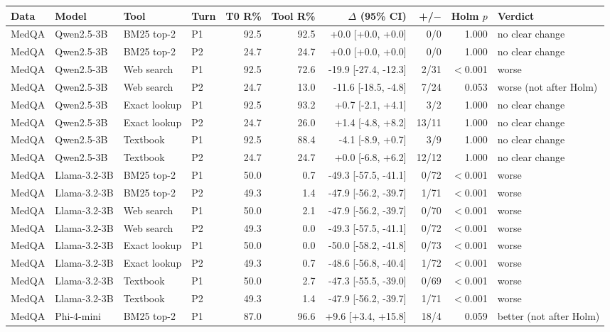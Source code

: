 \begin{tabular}{llll rrr rr l}
\toprule
Data & Model & Tool & Turn & T0 R\% & Tool R\% & $\Delta$ (95\% CI) & +/$-$ & Holm $p$ & Verdict\\
\midrule
MedQA & Qwen2.5-3B & BM25 top-2 & P1 & 92.5 & 92.5 & +0.0 [+0.0, +0.0] & 0/0 & 1.000 & no clear change\\
MedQA & Qwen2.5-3B & BM25 top-2 & P2 & 24.7 & 24.7 & +0.0 [+0.0, +0.0] & 0/0 & 1.000 & no clear change\\
MedQA & Qwen2.5-3B & Web search & P1 & 92.5 & 72.6 & -19.9 [-27.4, -12.3] & 2/31 & $<$0.001 & worse\\
MedQA & Qwen2.5-3B & Web search & P2 & 24.7 & 13.0 & -11.6 [-18.5, -4.8] & 7/24 & 0.053 & worse (not after Holm)\\
MedQA & Qwen2.5-3B & Exact lookup & P1 & 92.5 & 93.2 & +0.7 [-2.1, +4.1] & 3/2 & 1.000 & no clear change\\
MedQA & Qwen2.5-3B & Exact lookup & P2 & 24.7 & 26.0 & +1.4 [-4.8, +8.2] & 13/11 & 1.000 & no clear change\\
MedQA & Qwen2.5-3B & Textbook & P1 & 92.5 & 88.4 & -4.1 [-8.9, +0.7] & 3/9 & 1.000 & no clear change\\
MedQA & Qwen2.5-3B & Textbook & P2 & 24.7 & 24.7 & +0.0 [-6.8, +6.2] & 12/12 & 1.000 & no clear change\\
MedQA & Llama-3.2-3B & BM25 top-2 & P1 & 50.0 & 0.7 & -49.3 [-57.5, -41.1] & 0/72 & $<$0.001 & worse\\
MedQA & Llama-3.2-3B & BM25 top-2 & P2 & 49.3 & 1.4 & -47.9 [-56.2, -39.7] & 1/71 & $<$0.001 & worse\\
MedQA & Llama-3.2-3B & Web search & P1 & 50.0 & 2.1 & -47.9 [-56.2, -39.7] & 0/70 & $<$0.001 & worse\\
MedQA & Llama-3.2-3B & Web search & P2 & 49.3 & 0.0 & -49.3 [-57.5, -41.1] & 0/72 & $<$0.001 & worse\\
MedQA & Llama-3.2-3B & Exact lookup & P1 & 50.0 & 0.0 & -50.0 [-58.2, -41.8] & 0/73 & $<$0.001 & worse\\
MedQA & Llama-3.2-3B & Exact lookup & P2 & 49.3 & 0.7 & -48.6 [-56.8, -40.4] & 1/72 & $<$0.001 & worse\\
MedQA & Llama-3.2-3B & Textbook & P1 & 50.0 & 2.7 & -47.3 [-55.5, -39.0] & 0/69 & $<$0.001 & worse\\
MedQA & Llama-3.2-3B & Textbook & P2 & 49.3 & 1.4 & -47.9 [-56.2, -39.7] & 1/71 & $<$0.001 & worse\\
MedQA & Phi-4-mini & BM25 top-2 & P1 & 87.0 & 96.6 & +9.6 [+3.4, +15.8] & 18/4 & 0.059 & better (not after Holm)\\

\end{tabular}

